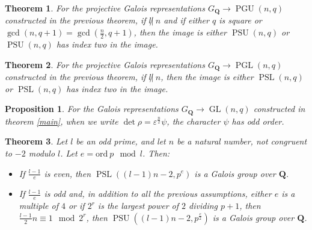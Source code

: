 \documentclass[10pt,a4paper]{amsart}
\newtheorem{theorem}{Theorem}
\newtheorem{proposition}{Proposition}
\DeclareMathOperator{\GL}{\mathrm{GL}}
\DeclareMathOperator{\PGL}{\mathrm{PGL}}
\DeclareMathOperator{\PGU}{\mathrm{PGU}}
\DeclareMathOperator{\PSL}{\mathrm{PSL}}
\DeclareMathOperator{\PSU}{\mathrm{PSU}}
\begin{document}
 	\begin{theorem} \label{unitary}
 		For the projective Galois representations $G_{\mathbf{Q}} \to \PGU(n,q)$ constructed in the previous theorem, if  $l {\not |}\ n$ and if either $q$ is square or $\gcd(n,q+1)=\gcd(\frac{n}{2},q+1)$, then the image is either $\PSU(n,q)$ or $\PSU(n,q)$ has index two in the image.
 	\end{theorem}

	\begin{theorem} \label{linear}
		For the projective Galois representations $G_{\mathbf{Q}} \to \PGL(n,q)$ constructed in the previous theorem, if  $l {\not |}\ n$, then the image is either $\PSL(n,q)$ or $\PSL(n,q)$ has index two in the image.
	\end{theorem}

	\begin{proposition} \label{odd'}
		For the Galois representations $G_{\mathbf{Q}} \to \GL(n,q)$ constructed in theorem \ref{main}, when we write $\det \rho = \varepsilon^{\frac{n}{2}} \psi$, the character $\psi$ has odd order.
	\end{proposition}

	\begin{theorem} \label{final}
		Let $l$ be an odd prime, and let $n$ be a natural number, not congruent to $-2$ modulo $l$. Let $e = \mathrm{ord} \ p \mod l$. Then:
		\begin{itemize}
			\item If $\frac{l-1}{e}$ is even, then $\PSL((l-1)n-2,p^e)$ is a Galois group over $\mathbf{Q}$.
			\item If $\frac{l-1}{e}$ is odd and, in addition to all the previous assumptions, either $e$ is a multiple of $4$ or if $2^r$ is the largest power of $2$ dividing $p+1$, then $\frac{l-1}{2}n \equiv 1 \mod 2^r$, then $\PSU((l-1)n - 2, p^{\frac{e}{2}})$ is a Galois group over $\mathbf{Q}$.
		\end{itemize}
	\end{theorem}
\end{document}
